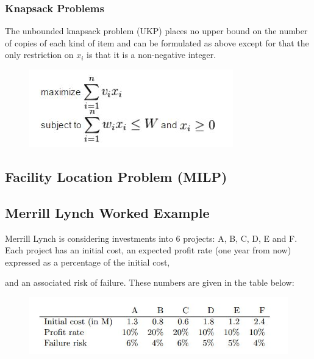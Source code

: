 \documentclass{beamer}
\begin{document}
\begin{frame}
	\frametitle{Knapsack Problems}
	\Large
The unbounded knapsack problem (UKP) places no upper bound on the number of copies of each kind of item and can be formulated as above except for that the only restriction on $x_i$ is that it is a non-negative integer.
	\begin{figure}
\centering
\includegraphics[width=0.9\linewidth]{unboundedknapsack}

\end{figure}

\end{frame}
\subsection{ Facility Location Problem (MILP) }
\begin{frame}
\end{frame}
\subsection{ Merrill Lynch Worked Example}
\begin{frame}
	Merrill Lynch is considering investments into 6 projects: A, B, C, D, E and F. Each project has an
	initial cost, an expected profit rate (one year from now) expressed as a percentage of the initial cost,

	and an associated risk of failure. These numbers are given in the table below:
\begin{figure}
\centering
\includegraphics[width=0.9\linewidth]{MErrillLynchExample}

\end{figure}

\end{frame}
\end{document}
